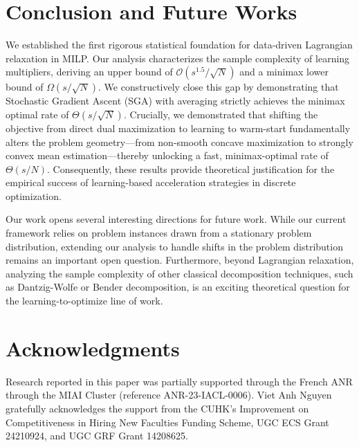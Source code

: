 \documentclass{article}
\theoremstyle{plain}
\theoremstyle{definition}
\theoremstyle{remark}
\begin{document}
\section{Conclusion and Future Works}
We established the first rigorous statistical foundation for data-driven Lagrangian relaxation in MILP. Our analysis characterizes the sample complexity of learning multipliers, deriving an upper bound of $\mathcal{O}(s^{1.5}/\sqrt{N})$ and a minimax lower bound of $\Omega(s/\sqrt{N})$. {We constructively close this gap by demonstrating that Stochastic Gradient Ascent (SGA) with averaging strictly achieves the minimax optimal rate of $\Theta(s/\sqrt{N})$}. Crucially, we demonstrated that shifting the objective from direct dual maximization to learning to warm-start fundamentally alters the problem geometry—from non-smooth concave maximization to strongly convex mean estimation—thereby unlocking a fast, minimax-optimal rate of $\Theta(s/N)$. Consequently, these results provide theoretical justification for the empirical success of learning-based acceleration strategies in discrete optimization.

Our work opens several interesting directions for future work. While our current framework relies on problem instances drawn from a stationary problem distribution, extending our analysis to handle shifts in the problem distribution remains an important open question. Furthermore, beyond Lagrangian relaxation, analyzing the sample complexity of other classical decomposition techniques, such as Dantzig-Wolfe or Bender decomposition, is an exciting theoretical question for the learning-to-optimize line of work. 

\section*{Acknowledgments} Research reported in this paper was partially supported through the French ANR through the MIAI Cluster (reference ANR-23-IACL-0006). Viet Anh Nguyen gratefully acknowledges the support from the CUHK’s Improvement on Competitiveness in Hiring New Faculties Funding Scheme, UGC ECS Grant 24210924, and UGC GRF Grant 14208625.





\newpage

\end{document}
